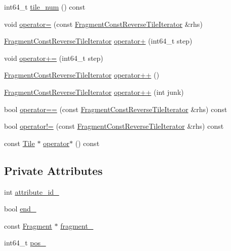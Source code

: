 \begin{DoxyCompactItemize}
int64\+\_\+t \hyperlink{classFragmentConstReverseTileIterator_af97efdf12dc0fe63e67368f368a16553}{tile\+\_\+num} () const 
\item 
void \hyperlink{classFragmentConstReverseTileIterator_abb954ce9d8dda81edbef6faa874a6112}{operator=} (const \hyperlink{classFragmentConstReverseTileIterator}{Fragment\+Const\+Reverse\+Tile\+Iterator} \&rhs)
\item 
\hyperlink{classFragmentConstReverseTileIterator}{Fragment\+Const\+Reverse\+Tile\+Iterator} \hyperlink{classFragmentConstReverseTileIterator_a678bead3fc3379bcdf655075af214686}{operator+} (int64\+\_\+t step)
\item 
void \hyperlink{classFragmentConstReverseTileIterator_a9b6613187f90eb6d275cf36de08709ba}{operator+=} (int64\+\_\+t step)
\item 
\hyperlink{classFragmentConstReverseTileIterator}{Fragment\+Const\+Reverse\+Tile\+Iterator} \hyperlink{classFragmentConstReverseTileIterator_adb9351f609ca40b762cf360028eb392b}{operator++} ()
\item 
\hyperlink{classFragmentConstReverseTileIterator}{Fragment\+Const\+Reverse\+Tile\+Iterator} \hyperlink{classFragmentConstReverseTileIterator_a0e5b32dd36a47ed6aa242f9c5d73321e}{operator++} (int junk)
\item 
bool \hyperlink{classFragmentConstReverseTileIterator_a1013d5b4b8262d12a7b90628fd03556c}{operator==} (const \hyperlink{classFragmentConstReverseTileIterator}{Fragment\+Const\+Reverse\+Tile\+Iterator} \&rhs) const 
\item 
bool \hyperlink{classFragmentConstReverseTileIterator_a448fdf0af0dfac5b1d2c8d8dd69d8453}{operator!=} (const \hyperlink{classFragmentConstReverseTileIterator}{Fragment\+Const\+Reverse\+Tile\+Iterator} \&rhs) const 
\item 
const \hyperlink{classTile}{Tile} $\ast$ \hyperlink{classFragmentConstReverseTileIterator_a62824df10b443d3cc87d25f9a1b03d15}{operator$\ast$} () const 
\end{DoxyCompactItemize}
\subsection*{Private Attributes}
\begin{DoxyCompactItemize}
\item 
int \hyperlink{classFragmentConstReverseTileIterator_afffe973051da13418204a273ca99165a}{attribute\+\_\+id\+\_\+}
\item 
bool \hyperlink{classFragmentConstReverseTileIterator_a641c0a1101d1e40212f6ff08c194e306}{end\+\_\+}
\item 
const \hyperlink{classFragment}{Fragment} $\ast$ \hyperlink{classFragmentConstReverseTileIterator_a7643b8798b40236437f522158bbb0878}{fragment\+\_\+}
\item 
int64\+\_\+t \hyperlink{classFragmentConstReverseTileIterator_a7daa9b8ff23856d902e988b89a5b6aec}{pos\+\_\+}
\end{DoxyCompactItemize}



